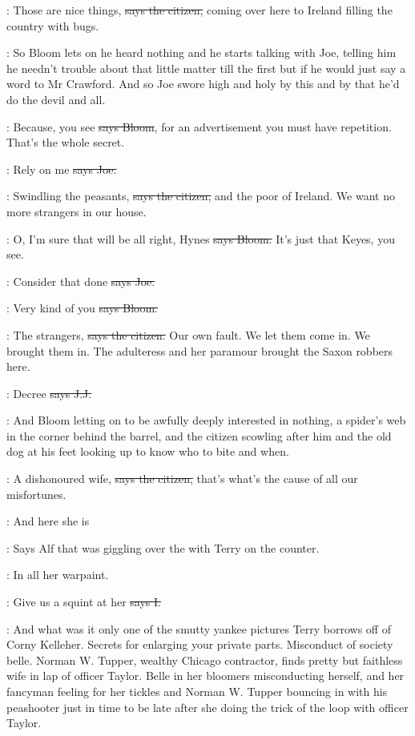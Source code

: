 \citizen:
Those are nice things,
\sout{says the citizen,}
coming over here to Ireland filling the country with bugs.

\Nq:
So Bloom lets on he heard nothing and he starts talking with Joe,
telling
him he needn't trouble about that little matter till the first but if he
would just say a word to Mr Crawford.
And so Joe swore high and holy by
this and by that he'd do the devil and all.

\Bloom:
Because,
you see
\sout{says Bloom},
for an advertisement you must have
repetition.
That's the whole secret.

\joe:
Rely on me
\sout{says Joe.}

\citizen:
Swindling the peasants,
\sout{says the citizen,}
and the poor of Ireland.
We
want no more strangers in our house.

\Bloom:
O,
I'm sure that will be all right,
Hynes
\sout{says Bloom.}
It's just that
Keyes,
you see.

\joe:
Consider that done
\sout{says Joe.}

\Bloom:
Very kind of you
\sout{says Bloom.}

\citizen:
The strangers,
\sout{says the citizen.}
Our own fault.
We let them come in.
We
brought them in.
The adulteress and her paramour brought the Saxon
robbers here.

\jjom:
Decree 
\sout{says J.J.}

\Nq:
And Bloom letting on to be awfully deeply interested in nothing,
a
spider's web in the corner behind the barrel,
and the citizen scowling
after him and the old dog at his feet looking up to know who to bite and
when.

\citizen:
A dishonoured wife,
\sout{says the citizen,}
that's what's the cause of all our
misfortunes.

\bergan:
And here she is

\Nq:
Says Alf that was giggling over the 
with Terry on the counter.

\bergan:
In all her warpaint.

:
Give us a squint at her
\sout{says I.}

\Nq:
And what was it only one of the smutty yankee pictures Terry
borrows off of Corny Kelleher.
Secrets for enlarging your private parts.
Misconduct of society belle.
Norman W.
Tupper,
wealthy Chicago
contractor,
finds pretty but faithless wife in lap of officer Taylor.
Belle in her bloomers misconducting herself,
and her fancyman feeling for
her tickles and Norman W.
Tupper bouncing in with his peashooter just in
time to be late after she doing the trick of the loop with officer Taylor.

